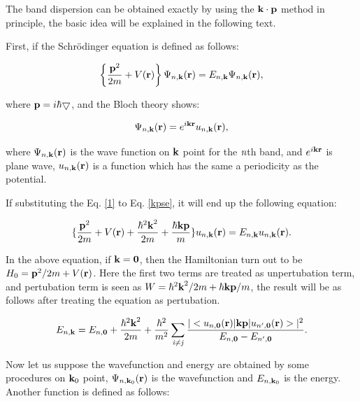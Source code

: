 \documentclass[a4paper, 12pt, titlepage,oneside,drop]{kthesis}
\begin{document}


The band dispersion can be obtained exactly by using the $\bold k \cdot \bold p$ method in principle, the basic idea will be explained in the following text.

First, if the Schrödinger equation is defined as follows:

\begin{equation}\label{kpse}
\left\{ \frac {{\textbf p}^2} {2m} + V({\textbf r}) \right\} \wfbloch<n>< \bold k> = \ebloch<n><\bold k> \wfbloch<n><\bold k>,
\end{equation}

where ${\textbf p} = i \hbar \bigtriangledown $, and the Bloch theory shows:

\begin{equation}\label{1}
 \wfbloch<n><\bold k> = \expg<k> \ubloch<n><\bold k>,
\end{equation}

where $\wfbloch<n><\bold k>$ is the wave function on ${\textbf k}$ point for the {$\textit n$}th band, and $\expg<k>$ is plane wave, $\ubloch<n><\bold k>$ is a function which has the same a periodicity as the potential.

If substituting the Eq. \ref{1} to Eq. \ref{kpse}, it will end up the following equation:

\begin{equation}
 \{  \frac{{\textbf p}^2}{2m} + V({\textbf r }) + \frac{{\hbar^2 {\textbf k}^2}}{2m} + \frac{{\hbar \textbf {kp}}}{m} \} \ubloch<n><\bold  k>  =  \ebloch<n><\bold  k> \ubloch<n><\bold  k>.
\end{equation}

In the above equation, if $\textbf k = \textbf 0$, then the Hamiltonian turn out to be $H_0 = {\textbf p}^2 / {2m} + V({\textbf r })$. Here the first two terms are treated as unpertubation term, and pertubation term is seen as
$W={{\hbar^2 {\textbf k}^2}}/{2m} + {{\hbar \textbf {kp}}}/{m}$, the result will be as follows after treating the equation as pertubation.

\begin{equation}
 \ebloch<n><\bold k> = E_{n,\textbf 0} + \frac{{\hbar^2 {\textbf k}^2}}{2m} + \frac{ \hbar^2}{m^2} \suminj<i><j> \frac{|<\ubloch<n><\bold 0>|{\textbf {kp}}|\ubloch<n'><\bold  0>>|^2}{E_{n,\textbf 0} - E_{n',\textbf 0}}.
\end{equation}


Now let us suppose the wavefunction and energy are obtained by some procedures on $\bold k_0$ point, $\wfbloch<n><\bold  k_0>$ is the wavefunction and $\ebloch<n><\textbf  k_0>$ is the energy.
Another function is defined as follows:
\end{document}
